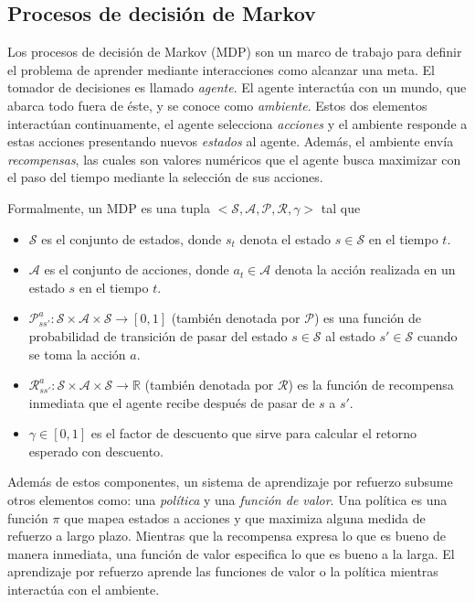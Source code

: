 \subsection{Procesos de decisión de Markov}


Los procesos de decisión de Markov (MDP) son un marco de trabajo para
definir el problema de aprender
mediante interacciones como 
alcanzar una meta. El tomador de 
decisiones es llamado \textit{agente}.
El agente interactúa con un mundo, que
abarca todo fuera de éste, y se
conoce como \textit{ambiente}.
Estos dos elementos
interactúan continuamente, el agente
selecciona \textit{acciones} y
el ambiente responde a estas 
acciones presentando nuevos 
\textit{estados} al agente. Además,
el ambiente envía \textit{recompensas},
las cuales son valores numéricos 
que el agente busca maximizar con
el paso del tiempo mediante la 
selección de sus acciones.

Formalmente, un MDP es una tupla $< \mathcal{S}, \mathcal{A}, \mathcal{P}, \mathcal{R}, \gamma>$ tal que

\begin{itemize}
    \item $\mathcal{S}$ es el conjunto de estados, donde $s_t$ denota el estado $s\in \mathcal{S}$ en el tiempo $t$.
    \item $\mathcal{A}$ es el conjunto de acciones, donde $a_t \in \mathcal{A}$
    denota la acción realizada en un estado $s$ en el tiempo $t$.
    \item $\mathcal{P}_{ss'}^{a}: \mathcal{S}\times \mathcal{A} \times \mathcal{S} \rightarrow [0, 1]$ (también denotada por $\mathcal{P}$) es una función de probabilidad de transición de pasar del estado $s \in \mathcal{S}$ al estado $s' \in \mathcal{S}$ cuando se toma la acción $a$.%
    \item $\mathcal{R}_{ss'}^{a}: \mathcal{S} \times \mathcal{A} \times \mathcal{S} \rightarrow \mathbb{R}$ (también denotada por $\mathcal{R}$) es la función de recompensa inmediata que el agente recibe después de pasar de $s$ a $s'$.
    \item $\gamma \in [0,1]$ es el factor de descuento que sirve para
    calcular el retorno esperado con descuento.
\end{itemize}


Además de estos componentes, un sistema de aprendizaje por refuerzo subsume otros elementos como: una \textit{política} y una \textit{función de valor}. Una política es una función $\pi$ que mapea estados
a acciones y que maximiza alguna medida de refuerzo a largo plazo. Mientras que la recompensa expresa lo que es bueno
de manera inmediata, una función de valor especifica lo que
es bueno a la larga. 
El aprendizaje por refuerzo aprende las funciones de valor o la política mientras 
interactúa con el ambiente.

